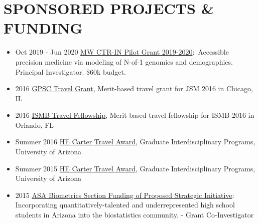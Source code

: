 \documentclass[paper=a4,fontsize=11pt]{scrartcl} %
\newcommand{\NewPart}[2]{\section*{\uppercase{#1} #2 }}
\begin{document}

\NewPart{Sponsored Projects \& Funding}{}
\vspace{-7pt}

\begin{itemize}[noitemsep]
      \item Oct 2019 - Jun 2020 \href{http://ctrin.unlv.edu/about/}{MW CTR-IN Pilot Grant 2019-2020}:~Accessible precision medicine via modeling of N-of-1 genomics and demographics. Principal Investigator. \$60k budget.
\item 2016 \href{http://gpsc.arizona.edu/travel-grants}{GPSC Travel Grant}, Merit-based travel grant for JSM 2016 in Chicago, IL
\item 2016 \href{https://www.iscb.org/ismb2016-submission/ismb2016-travel-fellowship-2}{ISMB Travel Fellowship}, Merit-based travel fellowship for ISMB 2016 in Orlando, FL
\item Summer 2016 \href{https://gidp.arizona.edu/carter-travel-award/award-recipients}{HE Carter Travel Award}, Graduate Interdisciplinary Programs, University of Arizona 
\item Summer 2015 \href{https://gidp.arizona.edu/carter-travel-award/award-recipients}{HE Carter Travel Award}, Graduate Interdisciplinary Programs, University of Arizona 
\item 2015 \href{http://stattrak.amstat.org/2014/03/01/grant-opportunity}{ASA Biometrics Section Funding of Proposed Strategic Initiative}:  Incorporating quantitatively-talented and underrepresented high school students in Arizona into the biostatistics community. - Grant Co-Investigator
\end{itemize}


 
\end{document}
